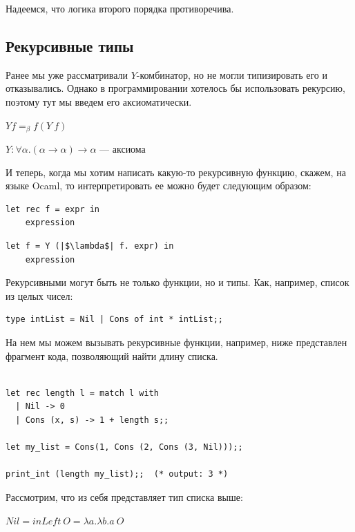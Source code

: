 \documentclass[12pt]{article}
\begin{document}
Надеемся, что логика второго порядка противоречива. \\

\subsection{Рекурсивные типы}

Ранее мы уже рассматривали $Y$-комбинатор, но не могли типизировать его и отказывались. 
Однако в программировании хотелось бы использовать рекурсию, поэтому тут мы введем его аксиоматически.

$Y f =_\beta f (Y\ f)$

$Y : \forall \alpha . (\alpha \rightarrow \alpha) \rightarrow \alpha$ --- аксиома

И теперь, когда мы хотим написать какую-то рекурсивную функцию, скажем, на языке Ocaml, то интерпретировать ее можно будет следующим образом:

\begin{paracol}{2}
\begin{verbatim}
let rec f = expr in
    expression
\end{verbatim}
\switchcolumn
\begin{verbatim}
let f = Y (|$\lambda$| f. expr) in
    expression
\end{verbatim}
\end{paracol}

Рекурсивными могут быть не только функции, но и типы. Как, например, список из целых чисел:

\begin{verbatim}
type intList = Nil | Cons of int * intList;;
\end{verbatim}

На нем мы можем вызывать рекурсивные функции, например, ниже представлен фрагмент кода, позволяющий найти длину списка. 

\begin{verbatim}

let rec length l = match l with 
  | Nil -> 0
  | Cons (x, s) -> 1 + length s;;

let my_list = Cons(1, Cons (2, Cons (3, Nil)));;

print_int (length my_list);;  (* output: 3 *)
\end{verbatim}

Рассмотрим, что из себя представляет тип списка выше:


$Nil = inLeft\ O = \lambda a. \lambda b. a\ O$ 
\end{document}
